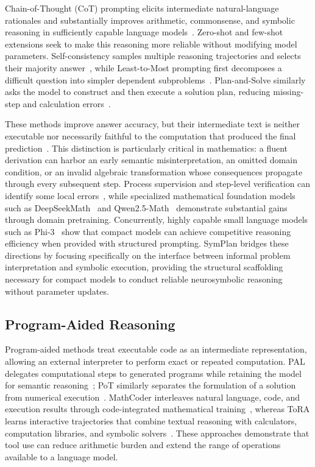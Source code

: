 \documentclass[conference,a4paper]{IEEEtran}
\begin{document}
Chain-of-Thought (CoT) prompting elicits intermediate natural-language rationales and substantially improves arithmetic, commonsense, and symbolic reasoning in sufficiently capable language models~\cite{wei2022cot}. Zero-shot and few-shot extensions seek to make this reasoning more reliable without modifying model parameters. Self-consistency samples multiple reasoning trajectories and selects their majority answer~\cite{wang2023selfconsistency}, while Least-to-Most prompting first decomposes a difficult question into simpler dependent subproblems~\cite{zhou2023leasttomost}. Plan-and-Solve similarly asks the model to construct and then execute a solution plan, reducing missing-step and calculation errors~\cite{wang2023plan}.

These methods improve answer accuracy, but their intermediate text is neither executable nor necessarily faithful to the computation that produced the final prediction~\cite{lyu2023faithful}. This distinction is particularly critical in mathematics: a fluent derivation can harbor an early semantic misinterpretation, an omitted domain condition, or an invalid algebraic transformation whose consequences propagate through every subsequent step. Process supervision and step-level verification can identify some local errors~\cite{lightman2024verify}, while specialized mathematical foundation models such as DeepSeekMath~\cite{shao2024deepseekmath} and Qwen2.5-Math~\cite{yang2024qwen25math} demonstrate substantial gains through domain pretraining. Concurrently, highly capable small language models such as Phi-3~\cite{abdin2024phi3} show that compact models can achieve competitive reasoning efficiency when provided with structured prompting. SymPlan bridges these directions by focusing specifically on the interface between informal problem interpretation and symbolic execution, providing the structural scaffolding necessary for compact models to conduct reliable neurosymbolic reasoning without parameter updates.

\subsection{Program-Aided Reasoning}

Program-aided methods treat executable code as an intermediate representation, allowing an external interpreter to perform exact or repeated computation. PAL delegates computational steps to generated programs while retaining the model for semantic reasoning~\cite{gao2023pal}; PoT similarly separates the formulation of a solution from numerical execution~\cite{chen2022pot}. MathCoder interleaves natural language, code, and execution results through code-integrated mathematical training~\cite{wang2024mathcoder}, whereas ToRA learns interactive trajectories that combine textual reasoning with calculators, computation libraries, and symbolic solvers~\cite{gou2024tora}. These approaches demonstrate that tool use can reduce arithmetic burden and extend the range of operations available to a language model.
\end{document}
